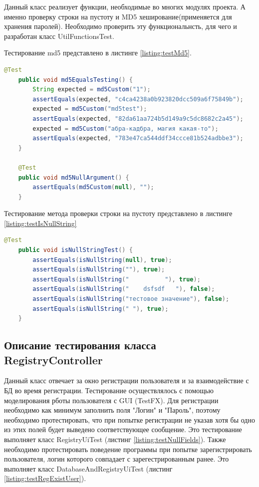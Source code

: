 \documentclass[a4paper,12pt]{article}
\begin{document}
Данный класс реализует функции, необходимые во многих модулях проекта. А именно проверку строки на пустоту и MD5 хеширование(применяется для хранения паролей). Необходимо проверить эту функциональнсть, для чего и разработан класс UtilFunctionsTest.
\par Тестирование md5 представлено в листинге \ref{listing:testMd5}.

\begin{lstlisting}[language=java, caption=тестирование md5 , label=listing:testMd5]
    @Test
    public void md5EqualsTesting() {
        String expected = md5Custom("1");
        assertEquals(expected, "c4ca4238a0b923820dcc509a6f75849b");
        expected = md5Custom("md5test");
        assertEquals(expected, "82da61aa724b5d149a9c5dc8682c2a45");
        expected = md5Custom("абра-кадбра, магия какая-то");
        assertEquals(expected, "783e47ca544ddf34ccce81b524adbbe3");
    }

    @Test
    public void md5NullArgument() {
        assertEquals(md5Custom(null), "");
    }

\end{lstlisting}


Тестирование метода проверки строки на пустоту представлено в листинге \ref{listing:testIsNullString}

\begin{lstlisting}[language=java, caption=тестирование isNullString, label=listing:testIsNullString]
    @Test
    public void isNullStringTest() {
        assertEquals(isNullString(null), true);
        assertEquals(isNullString(""), true);
        assertEquals(isNullString("          "), true);
        assertEquals(isNullString("    dsfsdf   "), false);
        assertEquals(isNullString("тестовое значение"), false);
        assertEquals(isNullString(" "), true);
    }
\end{lstlisting}

\subsection{Описание тестирования класса RegistryController}
Данный класс отвечает за окно регистрации пользователя и за взаимодействие с БД во время регистрации.
Тестирование осуществлялось с помощью моделирования рботы пользователя с GUI (TestFX). Для регистрации необходимо как минимум заполнить поля "Логин" и "Пароль", поэтому необходимо протестировать, что при попытке регистрации не указав хотя бы одно из этих полей будет выведено соответствующее сообщение. Это тестирование выполняет класс RegistryUiTest (листинг \ref{listing:testNullFields}). Также необходимо протестировать поведение программы при попытке зарегистрировать пользователя, логин которого совпадает с зарегестрированным ранее. Это выполняет класс DatabaseAndRegistryUiTest (листинг \ref{listing:testRegExistUser}).
\end{document}
